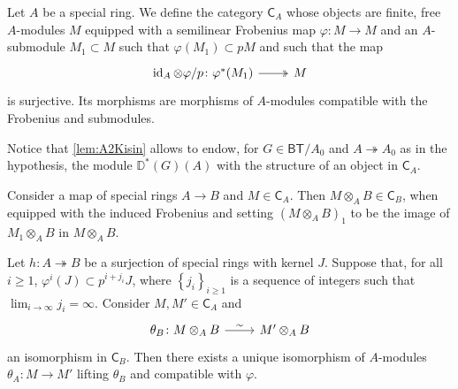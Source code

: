 \begin{defn}[]
	Let $A$ be a special ring. We define the category
	$\mathsf{C}_A$ whose objects are finite, free $A$-modules
	$M$ equipped with a semilinear Frobenius map $\varphi\colon M \to M$
	and an $A$-submodule $M_1 \subset M$ such that $\varphi(M_1) \subset pM$
	and such that the map
	\begin{equation*}
	\begin{tikzcd}[row sep = 0ex
		,/tikz/column 1/.append style={anchor=base east}
		,/tikz/column 2/.append style={anchor=base west}]
		\id_{ A }\otimes\varphi/p\colon 
		\varphi^*(M_1) \arrow[r, "", twoheadrightarrow] &
		M
	\end{tikzcd}
	\end{equation*} 
	is surjective.
	Its morphisms are morphisms of $A$-modules compatible with
	the Frobenius and submodules.
\end{defn}


\begin{rem}\label{rem:A2DGSStructure}
	Notice that \cref{lem:A2Kisin} allows to endow,
	for $G \in \mathsf{BT}/A_0$ and $A \twoheadrightarrow A_0$ as in the hypothesis,
	the module $\mathbb{D}^*(G)(A)$ with the structure of an object in $\mathsf{C}_A$.
\end{rem}


\begin{defn}[]
	Consider a map of special rings $A \to B$ and $M \in \mathsf{C}_A$.
	Then $M \otimes_A B \in \mathsf{C}_B$, when equipped with
	the induced Frobenius %
	and setting
	$\left( M \otimes_A B \right)_1$ to be the image of
	$M_1 \otimes_A B$ in $M \otimes_A B$.
\end{defn}


\begin{lem}\label{lem:A4Kisin}
	Let $h\colon A \twoheadrightarrow B$ be a surjection of special rings with kernel $J$.
	Suppose that, for all $i \geq 1$, $\varphi^i(J) \subset p^{i + j_i} J$,
	where $\left\{ j_i \right\}_{i \geq 1}$ is a sequence of integers
	such that $\lim_{i \to \infty} j_i = \infty$.
	Consider $M, M' \in \mathsf{C}_A$ and
	\begin{equation*}
	\begin{tikzcd}[row sep = 0ex
		,/tikz/column 1/.append style={anchor=base east}
		,/tikz/column 2/.append style={anchor=base west}]
		\theta_B\colon M \otimes_A B 
		\arrow[r, "\sim", rightarrow] &
		M' \otimes_A B
	\end{tikzcd}
	\end{equation*} 
	an isomorphism in $\mathsf{C}_B$.
	Then there exists a unique isomorphism of $A$-modules
	$\theta_A\colon M \to M'$ lifting $\theta_B$ and compatible with $\varphi$.
\end{lem} 



